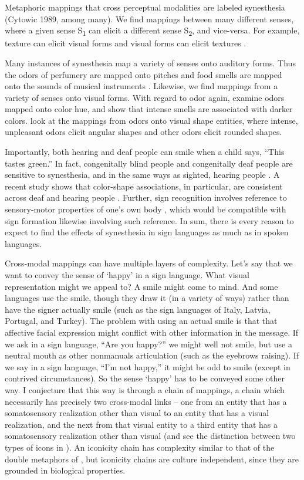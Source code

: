\documentclass[output=paper,
modfonts
]{LSP/langsci}
\begin{document}
Metaphoric mappings that cross perceptual modalities are labeled
synesthesia (Cytowic 1989, among many). We find mappings between many
different senses, where a given sense S\textsubscript{1} can elicit a
different sense S\textsubscript{2}, and vice-versa. For example, texture
can elicit visual forms \citep{simner2012,ludwig2013} and visual forms can elicit textures \citep{albertazzi2016}.

Many instances of synesthesia map a variety of senses onto auditory
forms. Thus the odors of perfumery are mapped onto pitches \citep{belkin1997} and food smells are mapped onto the sounds of musical
instruments \citep{crisinel2012}. Likewise, we find mappings from
a variety of senses onto visual forms. With regard to odor again,
\citet{dematte2006} examine odors mapped onto color hue, and \citet{kemp1997} show that intense smells are associated with darker
colors. \citet{hanson2013} look at the mappings
from odors onto visual shape entities, where intense, unpleasant odors
elicit angular shapes and other odors elicit rounded shapes.

Importantly, both hearing and deaf people can smile when a child says,
``This tastes green.'' In fact, congenitally blind people and
congenitally deaf people are sensitive to synesthesia, and in the same
ways as sighted, hearing people \citep{ittyerah1988}. A recent
study shows that color-shape associations, in particular, are consistent
across deaf and hearing people \citep{chen2014}. Further, sign
recognition involves reference to sensory-motor properties of one's own
body \citep{corina2016}, which would be compatible with sign
formation likewise involving such reference. In sum, there is every
reason to expect to find the effects of synesthesia in sign languages as
much as in spoken languages.

Cross-modal mappings can have multiple layers of complexity. Let's say
that we want to convey the sense of `happy' in a sign language. What
visual representation might we appeal to? A smile might come to mind.
And some languages use the smile, though they draw it (in a variety of
ways) rather than have the signer actually smile (such as the sign
languages of Italy, Latvia, Portugal, and Turkey). The problem with
using an actual smile is that that affective facial expression might
conflict with other information in the message. If we ask in a sign
language, ``Are you happy?'' we might well not smile, but use a neutral
mouth as other nonmanuals articulation (such as the eyebrows raising).
If we say in a sign language, ``I'm not happy,'' it might be odd to
smile (except in contrived circumstances). So the sense `happy' has to
be conveyed some other way. I conjecture that this way is through a
chain of mappings, a chain which necessarily has precisely two
cross-modal links -- one from an entity that has a somatosensory
realization other than visual to an entity that has a visual
realization, and the next from that visual entity to a third entity that
has a somatosensory realization other than visual (and see the
distinction between two types of icons in \citealt{pierce1932}). An iconicity
chain has complexity similar to that of the double metaphors of \citet{meir2010}, but iconicity chains are culture independent, since they are
grounded in biological properties.
\end{document}
